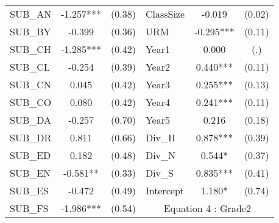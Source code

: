 \begin{table}[htb]
\begin{threeparttable}
\begin{tabular}{l c c|l c c }
    SUB\_AN                                      & -1.257***                  & (0.38)               & ClassSize           & -0.019                 & (0.02)               \\
    SUB\_BY                                      & -0.399                     & (0.36)               & URM                 & -0.295***              & (0.11)               \\
    SUB\_CH                                      & -1.285***                  & (0.42)               & Year1               & 0.000                  & (.)                  \\
    SUB\_CL                                      & -0.254                     & (0.39)               & Year2               & 0.440***               & (0.11)               \\
    SUB\_CN                                      & 0.045                      & (0.42)               & Year3               & 0.255***               & (0.13)               \\
    SUB\_CO                                      & 0.080                      & (0.42)               & Year4               & 0.241***               & (0.11)               \\
    SUB\_DA                                      & -0.257                     & (0.70)               & Year5               & 0.216                  & (0.18)               \\
    SUB\_DR                                      & 0.811                      & (0.66)               & Div\_H              & 0.878***               & (0.39)               \\
    SUB\_ED                                      & 0.182                      & (0.48)               & Div\_N              & 0.544*                 & (0.37)               \\
    SUB\_EN                                      & -0.581**                   & (0.33)               & Div\_S              & 0.835***               & (0.41)               \\
    SUB\_ES                                      & -0.472                     & (0.49)               & Intercept           & 1.180*                 & (0.74)               \\
    \cline{4-6}
    SUB\_FS                                      & -1.986***                  & (0.54)               & \multicolumn{3}{c}{Equation 4 : Grade2}                             \\
    \cline{4-6}

\end{tabular}
\end{threeparttable}
\end{table}
